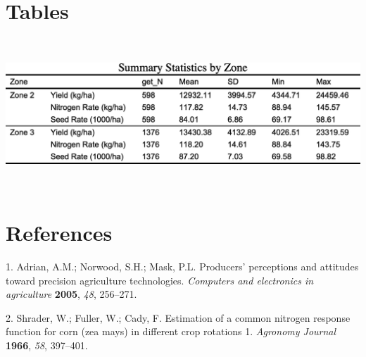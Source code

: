 \documentclass[
]{article}
\newenvironment{cslreferences}%
  {}%
  {\par}
\begin{document}
\hypertarget{tables}{%
\section{Tables}\label{tables}}

\includegraphics[width=6.72in,height=2.22in,keepaspectratio]{sample_to_word_files/figure-latex/table-1-1.png}

\hypertarget{references}{%
\section{References}\label{references}}

\hypertarget{refs}{}
\begin{cslreferences}
\leavevmode\hypertarget{ref-adrian2005producers}{}%
1. Adrian, A.M.; Norwood, S.H.; Mask, P.L. Producers' perceptions and
attitudes toward precision agriculture technologies. \emph{Computers and
electronics in agriculture} \textbf{2005}, \emph{48}, 256--271.

\leavevmode\hypertarget{ref-shrader1966estimation}{}%
2. Shrader, W.; Fuller, W.; Cady, F. Estimation of a common nitrogen
response function for corn (zea mays) in different crop rotations 1.
\emph{Agronomy Journal} \textbf{1966}, \emph{58}, 397--401.
\end{cslreferences}
\end{document}
